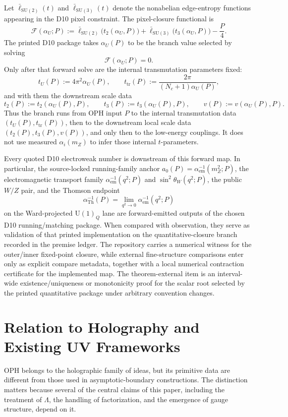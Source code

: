 \documentclass[11pt]{article}
\newcommand{\SU}{\mathrm{SU}}
\newcommand{\U}{\mathrm{U}}
\begin{document}
Let \(\bar\ell_{\SU(2)}(t)\) and \(\bar\ell_{\SU(3)}(t)\) denote the nonabelian edge-entropy functions appearing in the D10 pixel constraint. The pixel-closure functional is
\[
\mathcal F(\alpha_U;P)
:=
\bar\ell_{\SU(2)}\!\bigl(t_2(\alpha_U,P)\bigr)
+
\bar\ell_{\SU(3)}\!\bigl(t_3(\alpha_U,P)\bigr)
-\frac{P}{4}.
\]
The printed D10 package takes \(\alpha_U(P)\) to be the branch value selected by solving
\[
\mathcal F(\alpha_U;P)=0.
\]
Only after that forward solve are the internal transmutation parameters fixed:
\[
t_U(P):=4\pi^2\alpha_U(P),
\qquad
t_{\mathrm{tr}}(P):=\frac{2\pi}{(N_c+1)\alpha_U(P)},
\]
and with them the downstream scale data
\[
t_2(P):=t_2(\alpha_U(P),P),
\qquad
t_3(P):=t_3(\alpha_U(P),P),
\qquad
v(P):=v(\alpha_U(P),P).
\]
Thus the branch runs from OPH input \(P\) to the internal transmutation data
\((t_U(P),t_{\mathrm{tr}}(P))\), then to the downstream local scale data
\((t_2(P),t_3(P),v(P))\), and only then to the low-energy couplings. It does not use measured
\(\alpha_i(m_Z)\) to infer those internal \(t\)-parameters.

Every quoted D10 electroweak number is downstream of this forward map. In particular, the
source-locked running-family anchor \(a_0(P)=\alpha_{\mathrm{em}}^{-1}(m_Z^2;P)\), the
electromagnetic transport family \(\alpha_{\mathrm{em}}^{-1}(q^2;P)\) and \(\sin^2\theta_W(q^2;P)\), the public
\(W/Z\) pair, and the Thomson endpoint
\[
\alpha_{\mathrm{Th}}^{-1}(P)=\lim_{q^2\to0}\alpha_{\mathrm{em}}^{-1}(q^2;P)
\]
on the Ward-projected \(\U(1)_Q\) lane are forward-emitted outputs of the chosen D10
running/matching package. When compared with observation, they serve as validation of that printed
implementation on the quantitative-closure branch recorded in the premise ledger. The repository
carries a numerical witness for the outer/inner fixed-point closure, while external
fine-structure comparisons enter only as explicit compare metadata, together with a local numerical
contraction certificate for the implemented map. The theorem-external item is an
interval-wide existence/uniqueness or monotonicity proof for the scalar root selected by the printed
quantitative package under arbitrary convention changes.

\section{Relation to Holography and Existing UV Frameworks}

OPH belongs to the holographic family of ideas, but its primitive data are different from those used in asymptotic-boundary constructions. The distinction matters because several of the central claims of this paper, including the treatment of $\Lambda$, the handling of factorization, and the emergence of gauge structure, depend on it.
\end{document}
